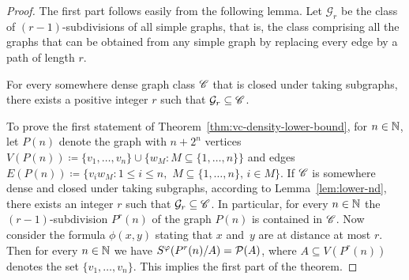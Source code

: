 
\begin{proof}
The first part follows easily from the following lemma.
Let $\mathcal{G}_r$ be the class of $(r-1)$-subdivisions of all 
simple graphs, that is, the class comprising
all the graphs that can be obtained from any simple graph by replacing every edge by a path of
length $r$.

\begin{lemma}\label{lem:lower-nd}
For every somewhere dense graph class $\mathscr{C}$ that is closed 
under taking subgraphs, there
exists a positive integer $r$ such that $\mathcal{G}_{r}\subseteq \mathscr{C}$.
\end{lemma}

To prove the first statement of Theorem~\ref{thm:vc-density-lower-bound}, 
for $n\in \mathbb{N}$, let $P(n)$ denote the graph with $n+2^n$ 
vertices $V(P(n))\coloneqq \{v_1,\ldots, v_n\}\cup \{w_M \colon M\subseteq \{1,\ldots, n\}\}$ and edges $E(P(n))\coloneqq \{v_iw_M \colon 1\leq i\leq n,$ $M\subseteq \{1,\ldots, n\},\, i\in M\}$. 
If $\mathscr{C}$ is somewhere dense and closed under taking subgraphs, 
according to Lemma~\ref{lem:lower-nd}, there exists an integer $r$ 
such that $\mathcal{G}_{r}\subseteq \mathscr{C}$. In particular, for every $n\in \mathbb{N}$ the $(r-1)$-subdivision $P^{r}(n)$ of the graph $P(n)$ is contained in $\mathscr{C}$.
Now consider 
the formula $\phi(x,y)$ stating that $x$ and~$y$ are at distance at most $r$. Then for every $n\in \mathbb{N}$ we have 
$S^\varphi(P^{r}(n)/A)=\mathcal{P}(A)$, where $A\subseteq V(P^{r}(n))$ denotes the set $\{v_1,\ldots, v_n\}$. This implies the first part
of the theorem. 


\end{proof}
